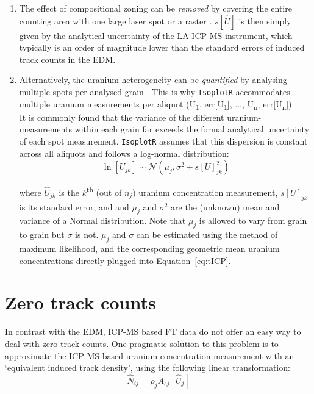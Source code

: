 \begin{refsection}
\begin{enumerate}
\item The effect of compositional zoning can be \emph{removed} by
  covering the entire counting area with one large laser spot
  \citep{soares2014} or a raster \citep{hasebe2004}. $s[\hat{U}]$ is
  then simply given by the analytical uncertainty of the LA-ICP-MS
  instrument, which typically is an order of magnitude lower than
  the standard errors of induced track counts in the EDM.
\item Alternatively, the uranium-heterogeneity can be
  \emph{quantified} by analysing multiple spots per analysed grain
  \citep{hasebe2009}. This is why \texttt{IsoplotR} accommodates
  multiple uranium measurements per aliquot (U\textsubscript{1},
  err[U\textsubscript{1}], $\ldots$, U\textsubscript{n},
  err[U\textsubscript{n}])\\

  It is commonly found that the variance of the different
  uranium-measurements within each grain far exceeds the formal
  analytical uncertainty of each spot measurement. \texttt{IsoplotR}
  assumes that this dispersion is constant across all aliquots and
  follows a log-normal distribution:
  \begin{equation}
    \ln\![U_{jk}] \sim \mathcal{N}(\mu_j,\sigma^2+s[U]_{jk}^2)
    \label{eq:lognorm}
  \end{equation}

  where $\hat{U}_{jk}$ is the $k$\textsuperscript{th} (out of $n_j$)
  uranium concentration measurement, $s[U]_{jk}$ is its standard
  error, and and $\mu_j$ and $\sigma^2$ are the (unknown) mean and
  variance of a Normal distribution. Note that $\mu_j$ is allowed to
  vary from grain to grain but $\sigma$ is not.  $\mu_j$ and $\sigma$
  can be estimated using the method of maximum likelihood, and the
  corresponding geometric mean uranium concentrations directly plugged
  into Equation~\ref{eq:tICP}.
\end{enumerate}

\section{Zero track counts}
\label{sec:zeroICP}

In contrast with the EDM, ICP-MS based FT data do not offer an easy
way to deal with zero track counts. One pragmatic solution to this
problem is to approximate the ICP-MS based uranium concentration
measurement with an `equivalent induced track density', using the
following linear transformation:
\begin{equation}
\hat{N}_{ij} = \rho_j A_{sj} [\hat{U}_j]
\end{equation}


\end{refsection}

